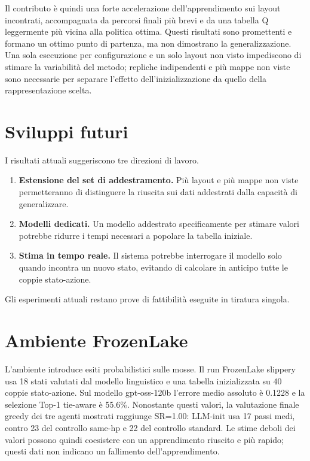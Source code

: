 \documentclass[12pt,a4paper]{article}
\begin{document}
Il contributo è quindi una forte accelerazione dell'apprendimento sui layout incontrati, accompagnata da percorsi finali più brevi e da una tabella Q leggermente più vicina alla politica ottima. Questi risultati sono promettenti e formano un ottimo punto di partenza, ma non dimostrano la generalizzazione. Una sola esecuzione per configurazione e un solo layout non visto impediscono di stimare la variabilità del metodo; repliche indipendenti e più mappe non viste sono necessarie per separare l'effetto dell'inizializzazione da quello della rappresentazione scelta.

\section{Sviluppi futuri}\label{sec:sviluppi}
I risultati attuali suggeriscono tre direzioni di lavoro.
\begin{enumerate}
\item \textbf{Estensione del set di addestramento.} Più layout e più mappe non viste permetteranno di distinguere la riuscita sui dati addestrati dalla capacità di generalizzare.
\item \textbf{Modelli dedicati.} Un modello addestrato specificamente per stimare valori potrebbe ridurre i tempi necessari a popolare la tabella iniziale.
\item \textbf{Stima in tempo reale.} Il sistema potrebbe interrogare il modello solo quando incontra un nuovo stato, evitando di calcolare in anticipo tutte le coppie stato-azione.
\end{enumerate}
Gli esperimenti attuali restano prove di fattibilità eseguite in tiratura singola.

\clearpage
\appendix
\section{Ambiente FrozenLake}\label{sec:frozenlake}
L'ambiente  introduce esiti probabilistici sulle mosse. Il run FrozenLake slippery usa 18 stati valutati dal modello linguistico e una tabella inizializzata su 40 coppie stato-azione. Sul modello gpt-oss-120b l'errore medio assoluto è 0.1228 e la selezione Top-1 tie-aware è 55.6\%. Nonostante questi valori, la valutazione finale greedy dei tre agenti mostrati raggiunge SR=1.00: LLM-init usa 17 passi medi, contro 23 del controllo same-hp e 22 del controllo standard. Le stime deboli dei valori possono quindi coesistere con un apprendimento riuscito e più rapido; questi dati non indicano un fallimento dell'apprendimento.
\end{document}
